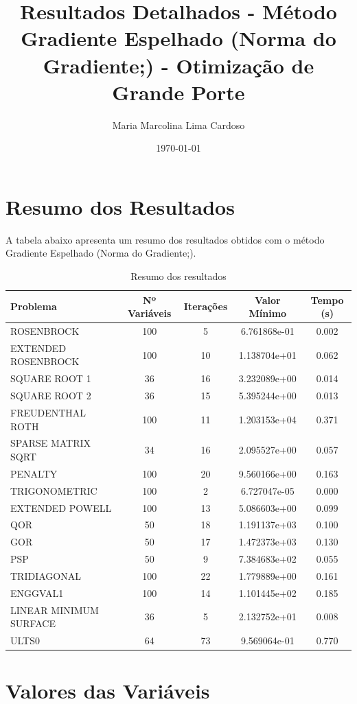 \documentclass[12pt]{article}
\title{Resultados Detalhados - Método Gradiente Espelhado (Norma do Gradiente;) - Otimização de Grande Porte}
\author{Maria Marcolina Lima Cardoso}
\date{\today}
\begin{document}
\maketitle

\section{Resumo dos Resultados}

A tabela abaixo apresenta um resumo dos resultados obtidos com o método Gradiente Espelhado (Norma do Gradiente;).

\begin{table}[h!]
\centering
\caption{Resumo dos resultados}
\label{tab:resumo}
\begin{tabular}{@{}lcccc@{}}
\toprule
\textbf{Problema} & \textbf{Nº Variáveis} & \textbf{Iterações} & \textbf{Valor Mínimo} & \textbf{Tempo (s)} \\
\midrule
ROSENBROCK & 100 & 5 & 6.761868e-01 & 0.002 \\
EXTENDED ROSENBROCK & 100 & 10 & 1.138704e+01 & 0.062 \\
SQUARE ROOT 1 & 36 & 16 & 3.232089e+00 & 0.014 \\
SQUARE ROOT 2 & 36 & 15 & 5.395244e+00 & 0.013 \\
FREUDENTHAL ROTH & 100 & 11 & 1.203153e+04 & 0.371 \\
SPARSE MATRIX SQRT & 34 & 16 & 2.095527e+00 & 0.057 \\
PENALTY & 100 & 20 & 9.560166e+00 & 0.163 \\
TRIGONOMETRIC & 100 & 2 & 6.727047e-05 & 0.000 \\
EXTENDED POWELL & 100 & 13 & 5.086603e+00 & 0.099 \\
QOR & 50 & 18 & 1.191137e+03 & 0.100 \\
GOR & 50 & 17 & 1.472373e+03 & 0.130 \\
PSP & 50 & 9 & 7.384683e+02 & 0.055 \\
TRIDIAGONAL & 100 & 22 & 1.779889e+00 & 0.161 \\
ENGGVAL1 & 100 & 14 & 1.101445e+02 & 0.185 \\
LINEAR MINIMUM SURFACE & 36 & 5 & 2.132752e+01 & 0.008 \\
ULTS0 & 64 & 73 & 9.569064e-01 & 0.770 \\

\bottomrule
\end{tabular}
\end{table}

\section{Valores das Variáveis}
\end{document}
